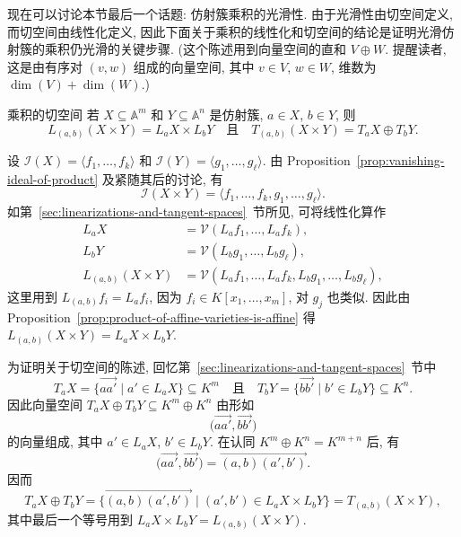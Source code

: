 现在可以讨论本节最后一个话题: 仿射簇乘积的光滑性. 由于光滑性由切空间定义, 而切空间由线性化定义, 因此下面关于乘积的线性化和切空间的结论是证明光滑仿射簇的乘积仍光滑的关键步骤. (这个陈述用到向量空间的直和 $V\oplus W$. 提醒读者, 这是由有序对 $(v,w)$ 组成的向量空间, 其中 $v\in V$, $w\in W$, 维数为 $\dim(V)+\dim(W)$.)

\begin{Proposition}{乘积的切空间}\leavevmode\label{prop:tangent-space-of-product}
若 $X\subseteq\mathbb{A}^{m}$ 和 $Y\subseteq\mathbb{A}^{n}$ 是仿射簇, $a\in X$, $b\in Y$, 则
\[
  L_{(a,b)}(X\times Y)=L_{a}X\times L_{b}Y
  \quad\text{且}\quad
  T_{(a,b)}(X\times Y)=T_{a}X\oplus T_{b}Y.
\]
\end{Proposition}
\begin{Proof}
设 $\mathcal{I}(X)=\langle f_{1},\ldots,f_{k}\rangle$ 和 $\mathcal{I}(Y)=\langle g_{1},\ldots,g_{\ell}\rangle$. 由 Proposition~\ref{prop:vanishing-ideal-of-product} 及紧随其后的讨论, 有
\[
  \mathcal{I}(X\times Y)=\langle f_{1},\ldots,f_{k},g_{1},\ldots,g_{\ell}\rangle.
\]
如第~\ref{sec:linearizations-and-tangent-spaces}~节所见, 可将线性化算作
\[
  \begin{aligned}
    L_{a}X&=\mathcal{V}(L_{a}f_{1},\ldots,L_{a}f_{k}),\\
    L_{b}Y&=\mathcal{V}(L_{b}g_{1},\ldots,L_{b}g_{\ell}),\\
    L_{(a,b)}(X\times Y)&=\mathcal{V}(L_{a}f_{1},\ldots,L_{a}f_{k},L_{b}g_{1},\ldots,L_{b}g_{\ell}),
  \end{aligned}
\]
这里用到 $L_{(a,b)}f_{i}=L_{a}f_{i}$, 因为 $f_{i}\in K[x_{1},\ldots,x_{m}]$, 对 $g_{j}$ 也类似. 因此由 Proposition~\ref{prop:product-of-affine-varieties-is-affine} 得 $L_{(a,b)}(X\times Y)=L_{a}X\times L_{b}Y$.

为证明关于切空间的陈述, 回忆第~\ref{sec:linearizations-and-tangent-spaces}~节中
\[
  T_{a}X=\{\overrightarrow{aa'}\mid a'\in L_{a}X\}\subseteq K^{m}
  \quad\text{且}\quad
  T_{b}Y=\{\overrightarrow{bb'}\mid b'\in L_{b}Y\}\subseteq K^{n}.
\]
因此向量空间 $T_{a}X\oplus T_{b}Y\subseteq K^{m}\oplus K^{n}$ 由形如
\[
  \bigl(\overrightarrow{aa'},\overrightarrow{bb'}\bigr)
\]
的向量组成, 其中 $a'\in L_{a}X$, $b'\in L_{b}Y$. 在认同 $K^{m}\oplus K^{n}=K^{m+n}$ 后, 有
\[
  \bigl(\overrightarrow{aa'},\overrightarrow{bb'}\bigr)
    =\overrightarrow{(a,b)(a',b')}.
\]
因而
\[
  T_{a}X\oplus T_{b}Y
    =\{\overrightarrow{(a,b)(a',b')}\mid(a',b')\in L_{a}X\times L_{b}Y\}
    =T_{(a,b)}(X\times Y),
\]
其中最后一个等号用到 $L_{a}X\times L_{b}Y=L_{(a,b)}(X\times Y)$.
\end{Proof}

